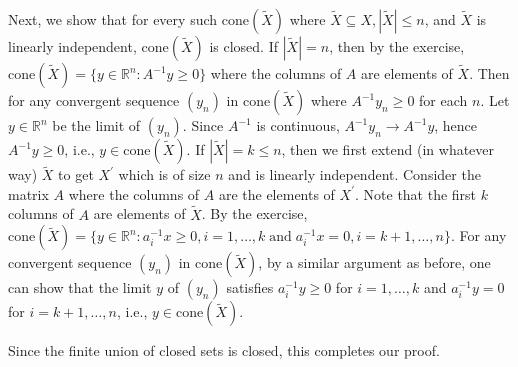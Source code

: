 \documentclass[11pt]{article}
\renewcommand{\leq}{\leqslant}
\renewcommand{\geq}{\geqslant}
\newcommand{\cone}{\mathrm{cone}}
\begin{document}
\begin{enumerate}[1)]
\begin{solution}
Next, we show that for every such $\cone(\tilde{X})$ where $\tilde{X} \subseteq X, |\tilde{X}| \leq n$, and $\tilde{X}$ is linearly independent, $\cone(\tilde{X})$ is closed. 
If $|\tilde{X}|=n$, then by the exercise, $\cone(\tilde{X}) = \{y\in \mathbb{R}^n: A^{-1}y\geq 0\}$ where the columns of $A$ are elements of $\tilde{X}$. Then for any convergent sequence $(y_n)$ in $\cone(\tilde{X})$ where $A^{-1}y_n \geq 0$ for each $n$. Let $y \in \mathbb{R}^n$ be the limit of $(y_n)$. Since $A^{-1}$ is continuous, $A^{-1}y_n \rightarrow A^{-1}y$, hence $A^{-1}y \geq 0$, i.e., $y \in \cone(\tilde{X})$.
If $|\tilde{X}|=k\leq n$, then we first extend (in whatever way) $\tilde{X}$ to get $X^\prime$ which is of size $n$ and is linearly independent. Consider the matrix $A$ where the columns of $A$ are the elements of $X^\prime$. Note that the first $k$ columns of $A$ are elements of $\tilde{X}$. By the exercise, $\cone(\tilde{X}) = \{y\in \mathbb{R}^n: a_i^{-1}x \geq 0, i=1, \dots, k \;\text{and}\;a_i^{-1}x=0, i=k+1, \dots, n \}$. For any convergent sequence $(y_n)$ in $\cone(\tilde{X})$, by a similar argument as before, one can show that the limit $y$ of $(y_n)$ satisfies $a_i^{-1} y \geq 0$ for $i=1, \dots, k$ and $a_i^{-1} y = 0$ for $i=k+1, \dots, n$, i.e., $y \in \cone(\tilde{X})$. 

Since the finite union of closed sets is closed, this completes our proof.

\end{solution}



\end{enumerate}
\end{document}
